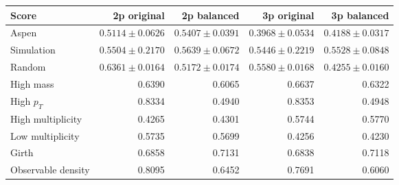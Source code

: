 \begin{tabular}{lrrrr}
\toprule
Score & 2p original & 2p balanced & 3p original & 3p balanced \\
\midrule
Aspen & $0.5114\pm0.0626$ & $0.5407\pm0.0391$ & $0.3968\pm0.0534$ & $0.4188\pm0.0317$ \\
Simulation & $0.5504\pm0.2170$ & $0.5639\pm0.0672$ & $0.5446\pm0.2219$ & $0.5528\pm0.0848$ \\
Random & $0.6361\pm0.0164$ & $0.5172\pm0.0174$ & $0.5580\pm0.0168$ & $0.4255\pm0.0160$ \\
High mass & 0.6390 & 0.6065 & 0.6637 & 0.6322 \\
High $p_T$ & 0.8334 & 0.4940 & 0.8353 & 0.4948 \\
High multiplicity & 0.4265 & 0.4301 & 0.5744 & 0.5770 \\
Low multiplicity & 0.5735 & 0.5699 & 0.4256 & 0.4230 \\
Girth & 0.6858 & 0.7131 & 0.6838 & 0.7118 \\
Observable density & 0.8095 & 0.6452 & 0.7691 & 0.6060 \\
\bottomrule
\end{tabular}

